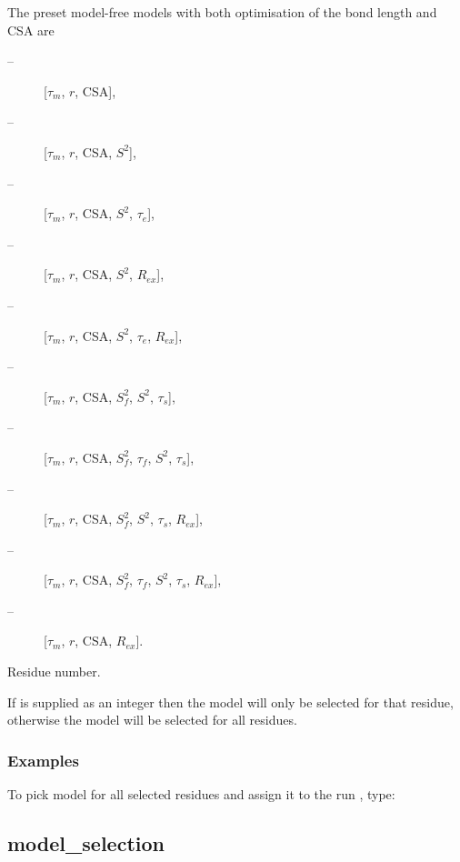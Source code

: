 The preset model-free models with both optimisation of the bond length and CSA are
\begin{description}
\item[    
 --]   [$\tau_m$, $r$, CSA],
\item[    
 --]   [$\tau_m$, $r$, CSA, $S^2$],
\item[    
 --]   [$\tau_m$, $r$, CSA, $S^2$, $\tau_e$],
\item[    
 --]   [$\tau_m$, $r$, CSA, $S^2$, $R_{ex}$],
\item[    
 --]   [$\tau_m$, $r$, CSA, $S^2$, $\tau_e$, $R_{ex}$],
\item[    
 --]   [$\tau_m$, $r$, CSA, $S^2_f$, $S^2$, $\tau_s$],
\item[    
 --]   [$\tau_m$, $r$, CSA, $S^2_f$, $\tau_f$, $S^2$, $\tau_s$],
\item[    
 --]   [$\tau_m$, $r$, CSA, $S^2_f$, $S^2$, $\tau_s$, $R_{ex}$],
\item[    
 --]   [$\tau_m$, $r$, CSA, $S^2_f$, $\tau_f$, $S^2$, $\tau_s$, $R_{ex}$],
\item[    
 --]   [$\tau_m$, $r$, CSA, $R_{ex}$].
\end{description}



Residue number.

If 
 is supplied as an integer then the model will only be selected for that
residue, otherwise the model will be selected for all residues.



\subsubsection{Examples}

To pick model 
 for all selected residues and assign it to the run 
, type:





\newpage

\subsection{model\_selection}


